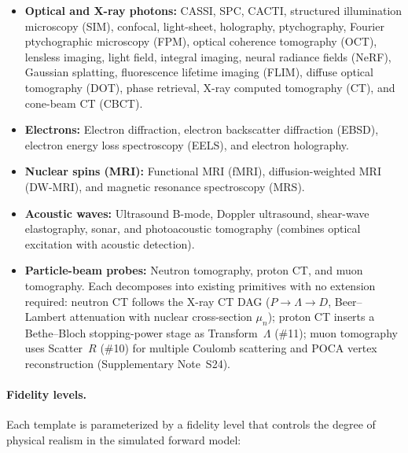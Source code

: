 \begin{itemize}
  \item \textbf{Optical and X-ray photons:}  CASSI, SPC, CACTI, structured
    illumination microscopy (SIM), confocal, light-sheet, holography,
    ptychography, Fourier ptychographic microscopy (FPM), optical coherence
    tomography (OCT), lensless imaging, light field, integral imaging,
    neural radiance fields (NeRF), Gaussian splatting, fluorescence
    lifetime imaging (FLIM), diffuse optical tomography (DOT),
    phase retrieval, X-ray computed tomography (CT), and cone-beam CT
    (CBCT).
  \item \textbf{Electrons:}  Electron diffraction, electron backscatter
    diffraction (EBSD), electron energy loss spectroscopy (EELS), and
    electron holography.
  \item \textbf{Nuclear spins (MRI):}  Functional MRI (fMRI), diffusion-weighted
    MRI (DW-MRI), and magnetic resonance spectroscopy (MRS).
  \item \textbf{Acoustic waves:}  Ultrasound B-mode, Doppler ultrasound,
    shear-wave elastography, sonar, and photoacoustic tomography
    (combines optical excitation with acoustic detection).
  \item \textbf{Particle-beam probes:}  Neutron tomography, proton CT,
    and muon tomography.  Each decomposes into existing primitives with
    no extension required: neutron CT follows the X-ray CT DAG
    ($P \!\to\! \Lambda \!\to\! D$, Beer--Lambert attenuation with nuclear
    cross-section $\mu_n$); proton CT inserts a Bethe--Bloch
    stopping-power stage as Transform~$\Lambda$ (\#11); muon tomography
    uses Scatter~$R$ (\#10) for multiple Coulomb scattering and
    POCA vertex reconstruction (Supplementary Note~S24).
\end{itemize}

\paragraph{Fidelity levels.}
Each template is parameterized by a fidelity level that controls the
degree of physical realism in the simulated forward model:

